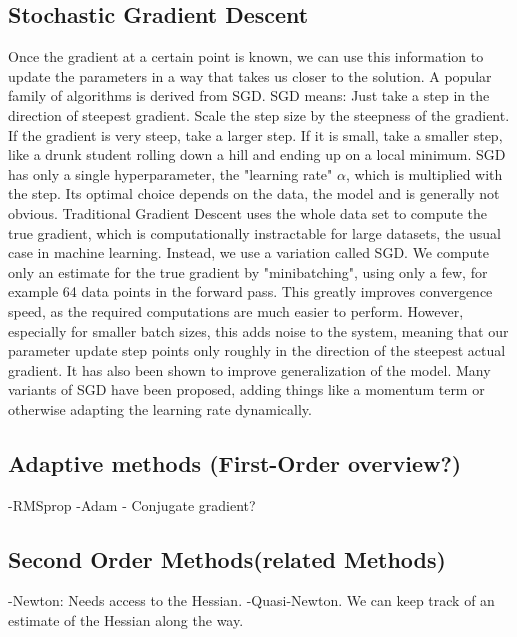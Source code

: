 \documentclass[twoside,12pt,a4paper]{report}
\begin{document}
\subsection{Stochastic Gradient Descent}
Once the gradient at a certain point is known, we can use this information to update the parameters in a way that takes us closer to the solution. A popular family of algorithms is derived from SGD. SGD means: Just take a step in the direction of steepest gradient. Scale the step size by the steepness of the gradient. If the gradient is very steep, take a larger step. If it is small, take a smaller step, like a drunk student rolling down a hill and ending up on a local minimum.
SGD has only a single hyperparameter, the "learning rate" $\alpha$, which is multiplied with the step. Its optimal choice depends on the data, the model and is generally not obvious.
Traditional Gradient Descent uses the whole data set to compute the true gradient, which is computationally instractable for large datasets, the usual case in machine learning. Instead, we use a variation called SGD. We compute only an estimate for the true gradient by "minibatching", using only a few, for example 64 data points in the forward pass. This greatly improves convergence speed, as the required computations are much easier to perform. However, especially for smaller batch sizes, this adds noise to the system, meaning that our parameter update step points only roughly in the direction of the steepest actual gradient. It has also been shown to improve generalization of the model.
Many variants of SGD have been proposed, adding things like a momentum term or otherwise adapting the learning rate dynamically.

\subsection{Adaptive methods (First-Order overview?)}
-RMSprop
-Adam
- Conjugate gradient?

\subsection{Second Order Methods(related Methods)}
-Newton: Needs access to the Hessian.
-Quasi-Newton.
We can keep track of an estimate of the Hessian along the way.
\end{document}
